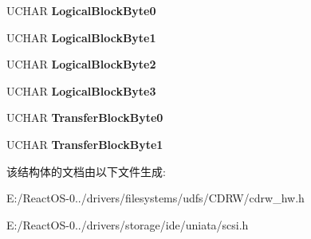 \begin{DoxyCompactItemize}
U\+C\+H\+AR {\bfseries Logical\+Block\+Byte0}
\item 
\mbox{\label{struct___c_d_b_1_1___n_e_c___r_e_a_d___c_d_d_a_a3cbdf53d5e951c3234941ecdfcb30834}} 
U\+C\+H\+AR {\bfseries Logical\+Block\+Byte1}
\item 
\mbox{\label{struct___c_d_b_1_1___n_e_c___r_e_a_d___c_d_d_a_a537001702805dfe14a3681643969ced8}} 
U\+C\+H\+AR {\bfseries Logical\+Block\+Byte2}
\item 
\mbox{\label{struct___c_d_b_1_1___n_e_c___r_e_a_d___c_d_d_a_a5c9bbe6278b0aefc7563e3a98cf136e9}} 
U\+C\+H\+AR {\bfseries Logical\+Block\+Byte3}
\item 
\mbox{\label{struct___c_d_b_1_1___n_e_c___r_e_a_d___c_d_d_a_a7abdc3f841117a8ee5f6dd6a9d7a2b75}} 
U\+C\+H\+AR {\bfseries Transfer\+Block\+Byte0}
\item 
\mbox{\label{struct___c_d_b_1_1___n_e_c___r_e_a_d___c_d_d_a_a67cb1391549500235f873abcf91ab47c}} 
U\+C\+H\+AR {\bfseries Transfer\+Block\+Byte1}
\end{DoxyCompactItemize}


该结构体的文档由以下文件生成\+:\begin{DoxyCompactItemize}
\item 
E\+:/\+React\+O\+S-\/0../drivers/filesystems/udfs/\+C\+D\+R\+W/cdrw\+\_\+hw.\+h\item 
E\+:/\+React\+O\+S-\/0../drivers/storage/ide/uniata/scsi.\+h\end{DoxyCompactItemize}
